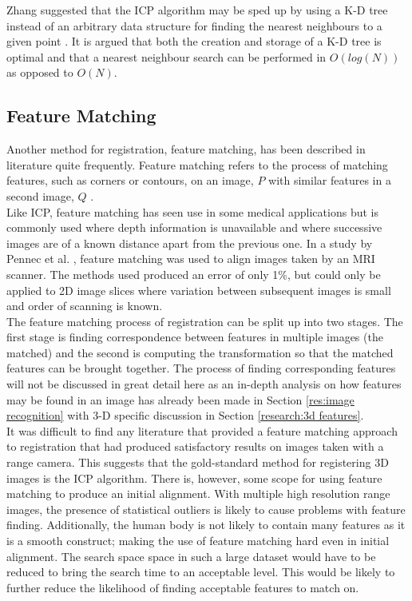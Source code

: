 Zhang suggested that the ICP algorithm may be sped up by using a K-D tree instead of an arbitrary data structure for finding the nearest neighbours to a given point \cite{zhang94}. It is argued that both the creation and storage of a K-D tree is optimal and that a nearest neighbour search can be performed in $O(log(N))$ as opposed to $O(N)$. \\

\subsection{Feature Matching}
Another method for registration, feature matching, has been described in literature quite frequently. Feature matching refers to the process of matching features, such as corners or contours, on an image, $P$ with similar features in a second image, $Q$ \cite{lv2008, mount99}. \\

Like ICP, feature matching has seen use in some medical applications but is commonly used where depth information is unavailable and where successive images are of a known distance apart from the previous one. In a study by Pennec et al. \cite{pennec98}, feature matching was used to align images taken by an MRI scanner. The methods used produced an error of only 1\%, but could only be applied to 2D image slices where variation between subsequent images is small and order of scanning is known.\\

The feature matching process of registration can be split up into two stages. The first stage is finding correspondence between features in multiple images (the matched) and the second is computing the transformation so that the matched features can be brought together. The process of finding corresponding features will not be discussed in great detail here as an in-depth analysis on how features may be found in an image has already been made in Section \ref{res:image recognition} with 3-D specific discussion in Section \ref{research:3d features}. \\

It was difficult to find any literature that provided a feature matching approach to registration that had produced satisfactory results on images taken with a range camera. This suggests that the gold-standard method for registering 3D images is the ICP algorithm. There is, however, some scope for using feature matching to produce an initial alignment. With multiple high resolution range images, the presence of statistical outliers is likely to cause problems with feature finding. Additionally, the human body is not likely to contain many features as it is a smooth construct; making the use of feature matching hard even in initial alignment. The search space space in such a large dataset would have to be reduced to bring the search time to an acceptable level. This would be likely to further reduce the likelihood of finding acceptable features to match on. \\



